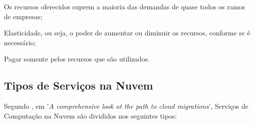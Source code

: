 \begin{alineas}
  \item Os recursos oferecidos suprem a maioria das demandas de quase todos os ramos de empresas;
  \item Elasticidade, ou seja, o poder de aumentar ou diminuir os recursos, conforme se é necessário;
  \item Pagar somente pelos recursos que são utilizados.
\end{alineas}

\subsection{Tipos de Serviços na Nuvem}
\label{s.cloudservices}

Segundo , em '{\em A comprehensive look at the path to cloud migrations}', Serviços de Computação na Nuvem são divididos nos seguintes tipos:

